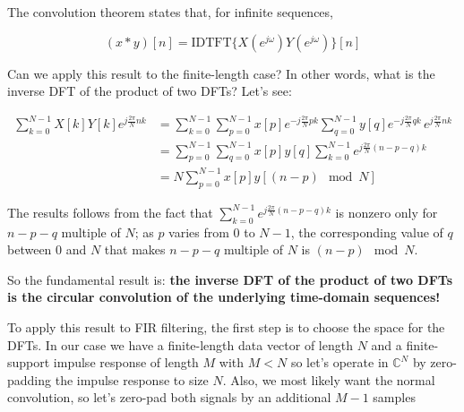 \documentclass[11pt]{article}
\begin{document}
The convolution theorem states that, for infinite sequences,

\[
    (x\ast y)[n] = \mbox{IDTFT}\{X(e^{j\omega})Y(e^{j\omega})\}[n]
\]

Can we apply this result to the finite-length case? In other words, what
is the inverse DFT of the product of two DFTs? Let's see:

\begin{align}
    \sum_{k=0}^{N-1}X[k]Y[k]e^{j\frac{2\pi}{N}nk} &= \sum_{k=0}^{N-1}\sum_{p=0}^{N-1}x[p]e^{-j\frac{2\pi}{N}pk}\sum_{q=0}^{N-1}y[q]e^{-j\frac{2\pi}{N}qk} \,e^{j\frac{2\pi}{N}nk} \\
    &= \sum_{p=0}^{N-1}\sum_{q=0}^{N-1}x[p]y[q]\sum_{k=0}^{N-1}e^{j\frac{2\pi}{N}(n-p-q)k} \\
    &= N\sum_{p=0}^{N-1}x[p]y[(n-p) \mod N]
\end{align}

The results follows from the fact that
\(\sum_{k=0}^{N-1}e^{j\frac{2\pi}{N}(n-p-q)k}\) is nonzero only for
\(n-p-q\) multiple of \(N\); as \(p\) varies from \(0\) to \(N-1\), the
corresponding value of \(q\) between \(0\) and \(N\) that makes
\(n-p-q\) multiple of \(N\) is \((n-p) \mod N\).

So the fundamental result is: \textbf{the inverse DFT of the product of
two DFTs is the circular convolution of the underlying time-domain
sequences!}

To apply this result to FIR filtering, the first step is to choose the
space for the DFTs. In our case we have a finite-length data vector of
length \(N\) and a finite-support impulse response of length \(M\) with
\(M<N\) so let's operate in \(\mathbb{C}^N\) by zero-padding the impulse
response to size \(N\). Also, we most likely want the normal
convolution, so let's zero-pad both signals by an additional \(M-1\)
samples
\end{document}
